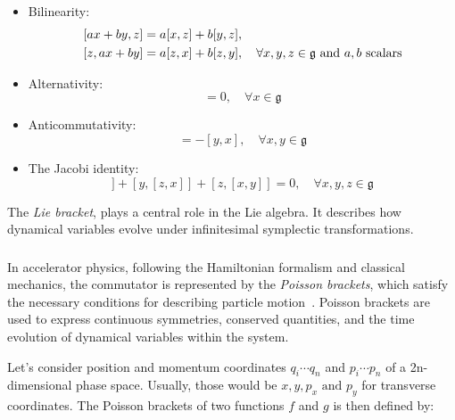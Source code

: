 \begin{itemize}
    \item Bilinearity:
    \begin{equation}
        \begin{aligned}
        \relax[ax+by, z] &= a[x,z] + b[y,z], \\
        [z, ax+by] &= a[z,x] + b[z,y], \quad \forall x,y,z \in \mathfrak{g}~\text{and}~a,b~\text{scalars}
        \label{eq:coordinates:bilinearity}
        \end{aligned}
    \end{equation}

    \item Alternativity:
    \begin{equation}
        [x,x] = 0, \quad \forall x \in \mathfrak{g}
    \end{equation}

    \item Anticommutativity:
    \begin{equation}
        [x,y] = -[y,x], \quad \forall x,y \in \mathfrak{g}
    \end{equation}

    \item The Jacobi identity:
    \begin{equation}
        [x,[y,z]] + [y, [z,x]] + [z, [x,y]] = 0, \quad \forall x,y,z \in \mathfrak{g}
        \label{eq:coordinates:jacobi_identity}
    \end{equation}
\end{itemize}

The \textit{Lie bracket}, plays a central role in the Lie algebra. It describes how dynamical
variables evolve under infinitesimal symplectic transformations.


\subsubsection{}

In accelerator physics, following the Hamiltonian formalism and classical mechanics, the commutator
is represented by the \textit{Poisson brackets}, which satisfy the necessary conditions for
describing particle motion~\cite{dragt_overview_2013,roy_analysis_1992}. Poisson brackets are used
to express continuous symmetries, conserved quantities, and the time evolution of dynamical
variables within the system. 

Let's consider position and momentum coordinates $q_i \cdots q_n$ and $p_i \cdots p_n$  of a
2n-dimensional phase space. Usually, those would be $x, y, p_x \text{ and } p_y$ for transverse
coordinates. The Poisson brackets of two functions $f$ and $g$ is then defined by:

